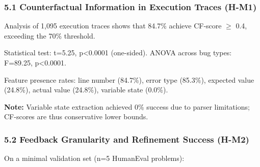 
\subsubsection{5.1 Counterfactual Information in Execution Traces (H-M1)}

Analysis of 1,095 execution traces shows that 84.7\% achieve CF-score $\geq$ 0.4, exceeding the 70\% threshold.

\begin{table}[htbp]
\centering
{}
\end{table}

Statistical test: t=5.25, p<0.0001 (one-sided). ANOVA across bug types: F=89.25, p<0.0001.

Feature presence rates: line number (84.7\%), error type (85.3\%), expected value (24.8\%), actual value (24.8\%), variable state (0.0\%).

\textbf{Note:} Variable state extraction achieved 0\% success due to parser limitations; CF-scores are thus conservative lower bounds.

\subsubsection{5.2 Feedback Granularity and Refinement Success (H-M2)}

On a minimal validation set (n=5 HumanEval problems):

\begin{table}[htbp]
\centering
{}
\end{table}

